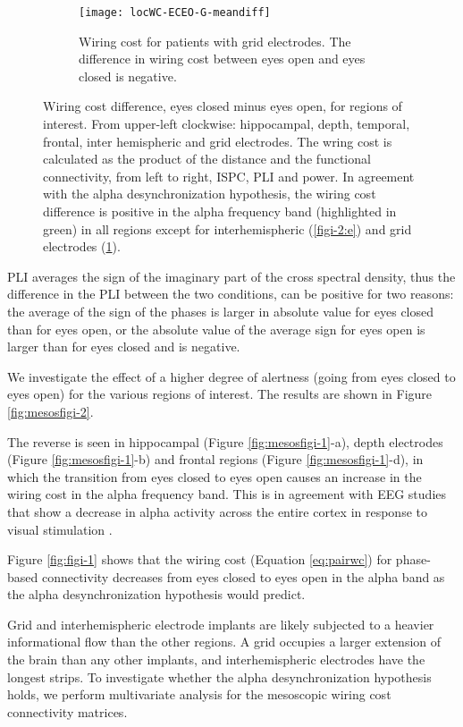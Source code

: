 \documentclass[11pt, onecolumn]{article}
\begin{document}
\begin{figure}[p]
\begin{adjustbox}{minipage=\linewidth,scale=0.9}
   \begin{subfigure}[t]{0.5\linewidth}
    \centering
    \texttt{[image: locWC-ECEO-G-meandiff]} 
    \caption{Wiring cost for patients with grid electrodes. The difference in wiring cost between eyes open and eyes closed is negative.} 
    \label{figi-2:f} 
  \end{subfigure} \newpage
  \caption{Wiring cost difference, eyes closed minus eyes open, for regions of interest. From upper-left clockwise: hippocampal, depth, temporal, frontal, inter hemispheric and grid electrodes. The wring cost is calculated as the product of the distance and the functional connectivity, from left to right, ISPC, PLI and power. In agreement with the alpha desynchronization hypothesis, the wiring cost difference is positive in the alpha frequency band (highlighted in green) in all regions except for interhemispheric (\ref{figi-2:e}) and grid electrodes (\ref{figi-2:f}).}
  \label{fig:figi-2} 
  \end{adjustbox}
\end{figure}
 



PLI averages the sign of the imaginary part of the cross spectral density, thus the difference in the PLI between the two conditions, can be positive for two reasons: the average of the sign of the phases is larger in absolute value for eyes closed than for eyes open, or the absolute value of the average sign for eyes open is larger than for eyes closed and is negative.

We investigate the effect of a higher degree of alertness (going from eyes closed to eyes open) for the various regions of interest. The results are shown in Figure \ref{fig:mesosfigi-2}. 

The reverse is seen in hippocampal (Figure \ref{fig:mesosfigi-1}-a), depth electrodes (Figure \ref{fig:mesosfigi-1}-b) and frontal regions (Figure \ref{fig:mesosfigi-1}-d), in which the transition from eyes closed to eyes open causes an increase in the wiring cost in  the alpha frequency band. This is in agreement with EEG studies that show a decrease in alpha activity across the entire cortex in response to visual stimulation \citep{barry2007eeg}.

Figure \ref{fig:figi-1} shows that the wiring cost (Equation \ref{eq:pairwc}) for phase-based connectivity decreases from eyes closed to eyes open in the alpha band as the alpha desynchronization hypothesis would predict.
 
Grid and interhemispheric electrode implants are likely subjected to a heavier informational flow than the other regions. A grid occupies a larger extension of the brain than any other implants, and interhemispheric electrodes have the longest strips.  
To investigate whether the alpha desynchronization hypothesis holds, we perform multivariate analysis for the mesoscopic wiring cost connectivity matrices.
 
\end{document}
